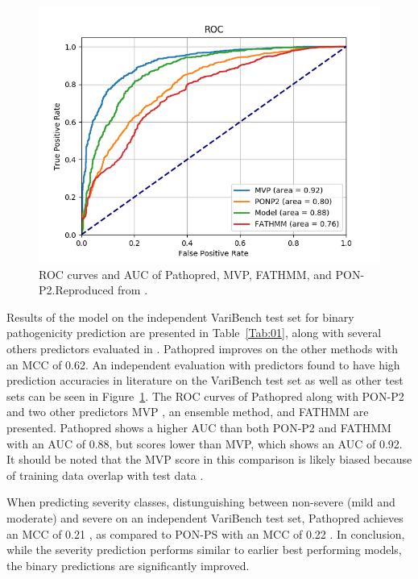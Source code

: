 \documentclass{bioinfo}
\begin{document}
\begin{figure}[!tpb]
\centerline{\includegraphics[scale=0.5]{varibench_tolerance_test_ROC.png}}
\caption{ROC curves and AUC of Pathopred, MVP, FATHMM, and PON-P2.\newline Reproduced from \citep{Kvist2018}.}\label{fig:01}
\end{figure}

Results of the model on the independent VariBench test set for binary pathogenicity prediction are presented in Table~\ref{Tab:01}, along with several others predictors evaluated in \citep{Niroula2015}. Pathopred improves on the other methods with an MCC of 0.62. An independent evaluation with predictors found to have high prediction accuracies in literature on the VariBench test set as well as other test sets can be seen in Figure~\ref{fig:01}. The ROC curves of Pathopred along with PON-P2 and two other predictors MVP \citep{Qi2018}, an ensemble method, and FATHMM \citep{Shihab2013} are presented. Pathopred shows a higher AUC than both PON-P2 and FATHMM with an AUC of 0.88, but scores lower than MVP, which shows an AUC of 0.92. It should be noted that the MVP score in this comparison is likely biased because of training data overlap with test data \citep{Kvist2018}. 

When predicting severity classes, distunguishing between non-severe (mild and moderate) and severe on an independent VariBench test set, Pathopred achieves an MCC of 0.21 \citep{Kvist2018}, as compared to PON-PS with an MCC of 0.22 \citep{Niroula2017}. In conclusion, while the severity prediction performs similar to earlier best performing models, the binary predictions are significantly improved.
\end{document}
